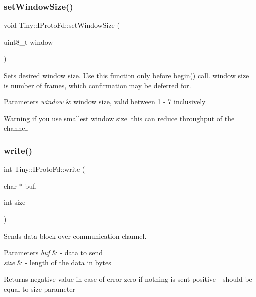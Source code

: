 \subsubsection{\texorpdfstring{set\+Window\+Size()}{setWindowSize()}}
{\footnotesize\ttfamily void Tiny\+::\+I\+Proto\+Fd\+::set\+Window\+Size (\begin{DoxyParamCaption}\item[{uint8\+\_\+t}]{window }\end{DoxyParamCaption})\hspace{0.3cm}{\ttfamily [inline]}}

Sets desired window size. Use this function only before \hyperlink{classTiny_1_1IProtoFd_aae4e613316866105c130d613ecb25dd4}{begin()} call. window size is number of frames, which confirmation may be deferred for. 
\begin{DoxyParams}{Parameters}
{\em window} & window size, valid between 1 -\/ 7 inclusively \\
\hline
\end{DoxyParams}
\begin{DoxyWarning}{Warning}
if you use smallest window size, this can reduce throughput of the channel. 
\end{DoxyWarning}
\mbox{\label{classTiny_1_1IProtoFd_adea59df6702e16fd986a91c7ee62012a}} 
\subsubsection{\texorpdfstring{write()}{write()}\hspace{0.1cm}{\footnotesize\ttfamily [1/2]}}
{\footnotesize\ttfamily int Tiny\+::\+I\+Proto\+Fd\+::write (\begin{DoxyParamCaption}\item[{char $\ast$}]{buf,  }\item[{int}]{size }\end{DoxyParamCaption})}

Sends data block over communication channel. 
\begin{DoxyParams}{Parameters}
{\em buf} & -\/ data to send \\
\hline
{\em size} & -\/ length of the data in bytes \\
\hline
\end{DoxyParams}
\begin{DoxyReturn}{Returns}
negative value in case of error zero if nothing is sent positive -\/ should be equal to size parameter 
\end{DoxyReturn}
\mbox{\label{classTiny_1_1IProtoFd_aa822a1dec320e6edc70a84699371fe81}} 
